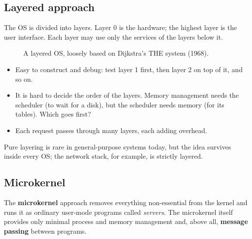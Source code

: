 \documentclass[11pt,a4paper]{article}
\newcommand{\term}[1]{\textbf{\color{mintdeep}#1}}
\begin{document}
\subsection{Layered approach}

The OS is divided into layers. Layer $0$ is the hardware; the highest layer is the user interface. Each layer may use only the services of the layers below it.

\begin{figure}[H]
\centering
{}
\caption{A layered OS, loosely based on Dijkstra's THE system (1968).}
\end{figure}

\begin{itemize}
  \item[\textcolor{mintdeep}{$+$}] Easy to construct and debug: test layer 1 first, then layer 2 on top of it, and so on.
  \item[\textcolor{red!60!black}{$-$}] It is hard to decide the order of the layers. Memory management needs the scheduler (to wait for a disk), but the scheduler needs memory (for its tables). Which goes first?
  \item[\textcolor{red!60!black}{$-$}] Each request passes through many layers, each adding overhead.
\end{itemize}

Pure layering is rare in general-purpose systems today, but the idea survives inside every OS; the network stack, for example, is strictly layered.

\subsection{Microkernel}
\label{sec:micro}

The \term{microkernel} approach removes everything non-essential from the kernel and runs it as ordinary user-mode programs called \emph{servers}. The microkernel itself provides only minimal process and memory management and, above all, \term{message passing} between programs.
\end{document}
